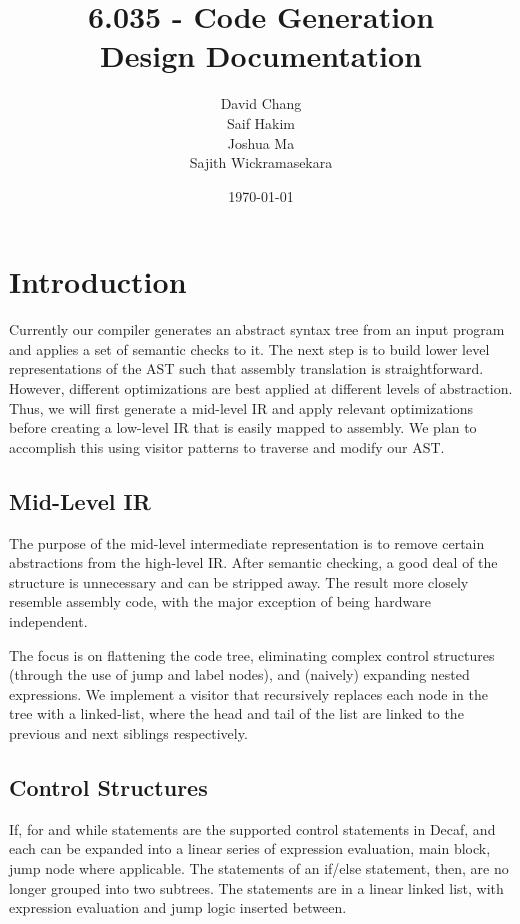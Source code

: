 \documentclass[12pt]{article}
\begin{document}
\title{6.035 - Code Generation \\ Design Documentation}
\author{David Chang \\ Saif Hakim \\ Joshua Ma \\Sajith Wickramasekara}
\date{\today}
\maketitle

\section{Introduction}
Currently our compiler generates an abstract syntax tree from an input program and applies a set of
semantic checks to it. The next step is to build lower level representations of the AST such that
assembly translation is straightforward. However, different optimizations are best applied at
different levels of abstraction. Thus, we will first generate a mid-level IR and apply relevant
optimizations before creating a low-level IR that is easily mapped to assembly. We plan to
accomplish this using visitor patterns to traverse and modify our AST.

\subsection{Mid-Level IR}
The purpose of the mid-level intermediate representation is to remove certain abstractions from the
high-level IR. After semantic checking, a good deal of the structure is unnecessary and can be
stripped away. The result more closely resemble assembly code, with the major exception of being
hardware independent.

The focus is on flattening the code tree, eliminating complex control structures (through the use of
jump and label nodes), and (naively) expanding nested expressions. We implement a visitor that
recursively replaces each node in the tree with a linked-list, where the head and tail of the list
are linked to the previous and next siblings respectively.

\subsection{Control Structures}
If, for and while statements are the supported control statements in Decaf, and each can be expanded
into a linear series of expression evaluation, main block, jump node where applicable. The
statements of an if/else statement, then, are no longer grouped into two subtrees. The statements
are in a linear linked list, with expression evaluation and jump logic inserted between.
\end{document}
